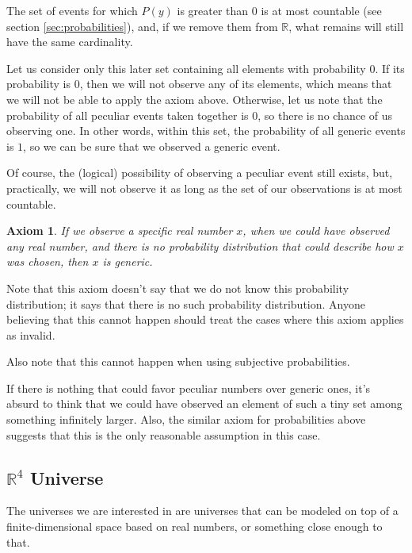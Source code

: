 \documentclass[a4paper
,draft
]{article}
\def\reale{\mathbb{R}}
\newtheorem{axiom}{Axiom}
\begin{document}
The set of events for which $P(y)$ is
greater than $0$ is at most countable (see section \ref{sec:probabilities}),
and, if we remove them from $\reale$, what remains will still have
the same cardinality.

Let us consider only this later set containing all elements with probability $0$.
If its probability is $0$, then we will not observe any of its elements,
which means that we will not be able to apply the axiom above.
Otherwise, let us note that the probability
of all peculiar events taken together is $0$, so there is no chance of us
observing one.
In other words, within this set, the probability of all generic events is $1$,
so we can be sure that we observed a generic event.

Of course, the (logical) possibility of observing a peculiar event still exists,
but, practically, we will not observe it as long as the set of our
observations is at most countable.

\begin{axiom}\label{ax:noprobability}
  If we observe a specific real number $x$, when we could have
  observed any real number, and there is no probability distribution that could
  describe how $x$ was chosen, then $x$ is generic.
\end{axiom}

Note that this axiom doesn't say that we do not know this probability
distribution; it says that there is no such probability distribution.
Anyone believing that this cannot happen should treat the cases where
this axiom applies as invalid.

Also note that this cannot happen when using subjective probabilities.

If there is nothing that could favor
peculiar numbers over generic ones, it's absurd to think that we could have
observed an element of such a tiny set among something infinitely larger.
Also, the similar axiom for probabilities above suggests that this is the only
reasonable assumption in this case.

\subsection{$\reale^4$ Universe}

The universes we are interested in are universes that can be
modeled on top of a finite-dimensional space based on real numbers,
or something close enough to that.
\end{document}
